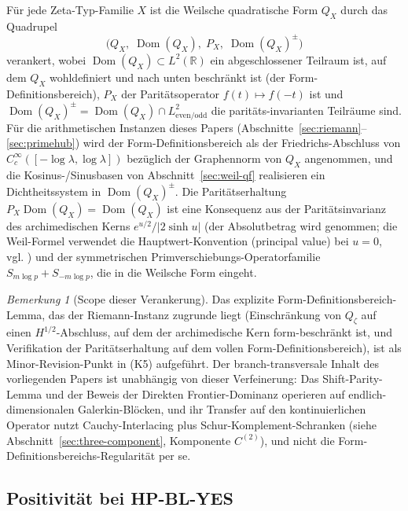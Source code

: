 \documentclass[11pt]{article}
\theoremstyle{definition}
\theoremstyle{remark}
\newtheorem{remark}[theorem]{Bemerkung}
\begin{document}
Für jede Zeta-Typ-Familie $X$ ist die Weilsche quadratische Form $Q_X$
durch das Quadrupel
\begin{equation}\label{eq:weil-quadruple}
  \bigl(Q_X,\; \operatorname{Dom}(Q_X),\; P_X,\;
        \operatorname{Dom}(Q_X)^{\pm}\bigr)
\end{equation}
verankert, wobei $\operatorname{Dom}(Q_X) \subset L^2(\mathbb{R})$ ein
abgeschlossener Teilraum ist, auf dem $Q_X$ wohldefiniert und nach unten beschränkt ist
(der Form-Definitionsbereich), $P_X$ der Paritätsoperator $f(t) \mapsto f(-t)$ ist und
$\operatorname{Dom}(Q_X)^{\pm} = \operatorname{Dom}(Q_X) \cap L^2_{\mathrm{even/odd}}$
die paritäts-invarianten Teilräume sind. Für die arithmetischen Instanzen
dieses Papers (Abschnitte~\ref{sec:riemann}--\ref{sec:primehub})
wird der Form-Definitionsbereich als der Friedrichs-Abschluss von
$C_c^{\infty}([-\log\lambda,\log\lambda])$ bezüglich der
Graphennorm von $Q_X$ angenommen, und die Kosinus-/Sinusbasen von
Abschnitt~\ref{sec:weil-qf} realisieren ein Dichtheitssystem in
$\operatorname{Dom}(Q_X)^{\pm}$. Die Paritätserhaltung
$P_X \operatorname{Dom}(Q_X) = \operatorname{Dom}(Q_X)$ ist eine
Konsequenz aus der Paritätsinvarianz des archimedischen Kerns
$e^{u/2}/|2\sinh u|$ (der Absolutbetrag wird genommen; die Weil-Formel verwendet
die Hauptwert-Konvention (principal value) bei $u = 0$, vgl. \cite{Weil1952})
und der symmetrischen Primverschiebungs-Operatorfamilie
$S_{m\log p} + S_{-m\log p}$, die in die Weilsche Form eingeht.

\begin{remark}[Scope dieser Verankerung]\label{rem:form-domain-scope}
Das explizite Form-Definitionsbereich-Lemma, das der Riemann-Instanz
zugrunde liegt (Einschränkung von $Q_\zeta$ auf einen $H^{1/2}$-Abschluss, auf dem der
archimedische Kern form-beschränkt ist, und Verifikation der Paritätserhaltung
auf dem vollen Form-Definitionsbereich), ist als Minor-Revision-Punkt
in \cite{RHCritiqueReview2026} (K5) aufgeführt. Der branch-transversale Inhalt
des vorliegenden Papers ist unabhängig von dieser Verfeinerung: Das Shift-Parity-Lemma
und der Beweis der Direkten Frontier-Dominanz operieren auf
endlich-dimensionalen Galerkin-Blöcken, und ihr Transfer auf den kontinuierlichen Operator
nutzt Cauchy-Interlacing plus Schur-Komplement-Schranken (siehe
Abschnitt~\ref{sec:three-component}, Komponente $C^{(2)}$), und nicht
die Form-Definitionsbereichs-Regularität per se.
\end{remark}

\subsection{Positivität bei HP-BL-YES}
\end{document}
